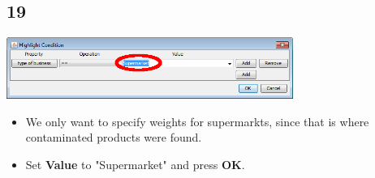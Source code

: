 \documentclass{beamer}
\begin{document}
\subsection{19}
\begin{frame}
	\begin{center}
  		\includegraphics[width=0.7\textwidth]{19.png}
	\end{center}
	\begin{itemize}
		\item We only want to specify weights for supermarkts, since that is where contaminated products were found.
		\item Set \textbf{Value} to "Supermarket" and press \textbf{OK}.
	\end{itemize}
\end{frame}
\end{document}
